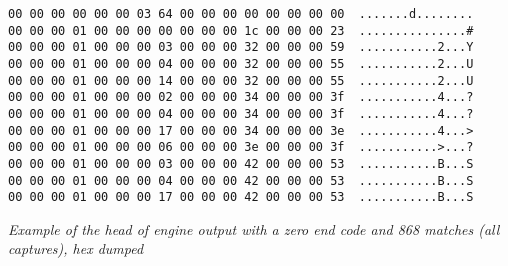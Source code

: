 \begin{myquote}
\begin{verbatim}
00 00 00 00 00 00 03 64 00 00 00 00 00 00 00 00  .......d........
00 00 00 01 00 00 00 00 00 00 00 1c 00 00 00 23  ...............#
00 00 00 01 00 00 00 03 00 00 00 32 00 00 00 59  ...........2...Y
00 00 00 01 00 00 00 04 00 00 00 32 00 00 00 55  ...........2...U
00 00 00 01 00 00 00 14 00 00 00 32 00 00 00 55  ...........2...U
00 00 00 01 00 00 00 02 00 00 00 34 00 00 00 3f  ...........4...?
00 00 00 01 00 00 00 04 00 00 00 34 00 00 00 3f  ...........4...?
00 00 00 01 00 00 00 17 00 00 00 34 00 00 00 3e  ...........4...>
00 00 00 01 00 00 00 06 00 00 00 3e 00 00 00 3f  ...........>...?
00 00 00 01 00 00 00 03 00 00 00 42 00 00 00 53  ...........B...S
00 00 00 01 00 00 00 04 00 00 00 42 00 00 00 53  ...........B...S
00 00 00 01 00 00 00 17 00 00 00 42 00 00 00 53  ...........B...S

\end{verbatim}
\end{myquote}
\textit{Example of the head of engine output with a zero end code
and 868 matches (all captures), hex dumped}

